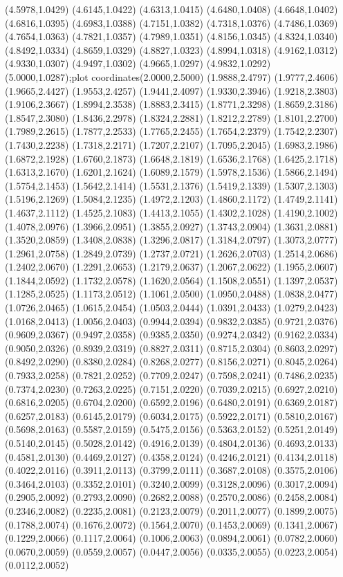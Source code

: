 {(4.5978,1.0429) (4.6145,1.0422) (4.6313,1.0415) (4.6480,1.0408) (4.6648,1.0402) (4.6816,1.0395) (4.6983,1.0388) (4.7151,1.0382) (4.7318,1.0376) (4.7486,1.0369) (4.7654,1.0363) (4.7821,1.0357) (4.7989,1.0351) (4.8156,1.0345) (4.8324,1.0340) (4.8492,1.0334) (4.8659,1.0329) (4.8827,1.0323) (4.8994,1.0318) (4.9162,1.0312) (4.9330,1.0307) (4.9497,1.0302) (4.9665,1.0297) (4.9832,1.0292) (5.0000,1.0287)};plot coordinates{(2.0000,2.5000) (1.9888,2.4797) (1.9777,2.4606) (1.9665,2.4427) (1.9553,2.4257) (1.9441,2.4097) (1.9330,2.3946) (1.9218,2.3803) (1.9106,2.3667) (1.8994,2.3538) (1.8883,2.3415) (1.8771,2.3298) (1.8659,2.3186) (1.8547,2.3080) (1.8436,2.2978) (1.8324,2.2881) (1.8212,2.2789) (1.8101,2.2700) (1.7989,2.2615) (1.7877,2.2533) (1.7765,2.2455) (1.7654,2.2379) (1.7542,2.2307) (1.7430,2.2238) (1.7318,2.2171) (1.7207,2.2107) (1.7095,2.2045) (1.6983,2.1986) (1.6872,2.1928) (1.6760,2.1873) (1.6648,2.1819) (1.6536,2.1768) (1.6425,2.1718) (1.6313,2.1670) (1.6201,2.1624) (1.6089,2.1579) (1.5978,2.1536) (1.5866,2.1494) (1.5754,2.1453) (1.5642,2.1414) (1.5531,2.1376) (1.5419,2.1339) (1.5307,2.1303) (1.5196,2.1269) (1.5084,2.1235) (1.4972,2.1203) (1.4860,2.1172) (1.4749,2.1141) (1.4637,2.1112) (1.4525,2.1083) (1.4413,2.1055) (1.4302,2.1028) (1.4190,2.1002) (1.4078,2.0976) (1.3966,2.0951) (1.3855,2.0927) (1.3743,2.0904) (1.3631,2.0881) (1.3520,2.0859) (1.3408,2.0838) (1.3296,2.0817) (1.3184,2.0797) (1.3073,2.0777) (1.2961,2.0758) (1.2849,2.0739) (1.2737,2.0721) (1.2626,2.0703) (1.2514,2.0686) (1.2402,2.0670) (1.2291,2.0653) (1.2179,2.0637) (1.2067,2.0622) (1.1955,2.0607) (1.1844,2.0592) (1.1732,2.0578) (1.1620,2.0564) (1.1508,2.0551) (1.1397,2.0537) (1.1285,2.0525) (1.1173,2.0512) (1.1061,2.0500) (1.0950,2.0488) (1.0838,2.0477) (1.0726,2.0465) (1.0615,2.0454) (1.0503,2.0444) (1.0391,2.0433) (1.0279,2.0423) (1.0168,2.0413) (1.0056,2.0403) (0.9944,2.0394) (0.9832,2.0385) (0.9721,2.0376) (0.9609,2.0367) (0.9497,2.0358) (0.9385,2.0350) (0.9274,2.0342) (0.9162,2.0334) (0.9050,2.0326) (0.8939,2.0319) (0.8827,2.0311) (0.8715,2.0304) (0.8603,2.0297) (0.8492,2.0290) (0.8380,2.0284) (0.8268,2.0277) (0.8156,2.0271) (0.8045,2.0264) (0.7933,2.0258) (0.7821,2.0252) (0.7709,2.0247) (0.7598,2.0241) (0.7486,2.0235) (0.7374,2.0230) (0.7263,2.0225) (0.7151,2.0220) (0.7039,2.0215) (0.6927,2.0210) (0.6816,2.0205) (0.6704,2.0200) (0.6592,2.0196) (0.6480,2.0191) (0.6369,2.0187) (0.6257,2.0183) (0.6145,2.0179) (0.6034,2.0175) (0.5922,2.0171) (0.5810,2.0167) (0.5698,2.0163) (0.5587,2.0159) (0.5475,2.0156) (0.5363,2.0152) (0.5251,2.0149) (0.5140,2.0145) (0.5028,2.0142) (0.4916,2.0139) (0.4804,2.0136) (0.4693,2.0133) (0.4581,2.0130) (0.4469,2.0127) (0.4358,2.0124) (0.4246,2.0121) (0.4134,2.0118) (0.4022,2.0116) (0.3911,2.0113) (0.3799,2.0111) (0.3687,2.0108) (0.3575,2.0106) (0.3464,2.0103) (0.3352,2.0101) (0.3240,2.0099) (0.3128,2.0096) (0.3017,2.0094) (0.2905,2.0092) (0.2793,2.0090) (0.2682,2.0088) (0.2570,2.0086) (0.2458,2.0084) (0.2346,2.0082) (0.2235,2.0081) (0.2123,2.0079) (0.2011,2.0077) (0.1899,2.0075) (0.1788,2.0074) (0.1676,2.0072) (0.1564,2.0070) (0.1453,2.0069) (0.1341,2.0067) (0.1229,2.0066) (0.1117,2.0064) (0.1006,2.0063) (0.0894,2.0061) (0.0782,2.0060) (0.0670,2.0059) (0.0559,2.0057) (0.0447,2.0056) (0.0335,2.0055) (0.0223,2.0054) (0.0112,2.0052) }
